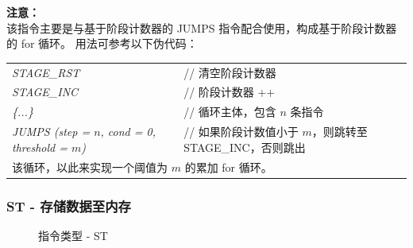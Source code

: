 \documentclass[main\_\_CN.tex]{subfiles}
\begin{document}
\vspace{-2em}
\textbf{注意：} \\
    该指令主要是与基于阶段计数器的 JUMPS 指令配合使用，构成基于阶段计数器的 for 循环。
    用法可参考以下伪代码：

\begin{table}[H]
    \centering
    \begin{tabular}{ l l }
    \textit{STAGE\_RST}  & // 清空阶段计数器   \\
    \textit{STAGE\_INC} & // 阶段计数器 ++  \\
    \textit{\{...\}} &  // 循环主体，包含 \begin{math}n\end{math} 条指令   \\
    \textit{JUMPS (step = \begin{math}n\end{math}, cond = 0, threshold = \begin{math}m\end{math})}  & // 如果阶段计数值小于 \begin{math}m\end{math}，则跳转至 STAGE\_INC，否则跳出 \\
    \multicolumn{2}{l}{该循环，以此来实现一个阈值为 \begin{math}m\end{math} 的累加 for 循环。}
    \end{tabular}
\end{table}

\subsubsection{ST - 存储数据至内存}\label{para:st-instruction}


%
%
%
%
%
%
%
%
%
%
%
%
\begin{figure}[H]
    \centering
    \caption{指令类型 - ST}
    \label{fig:ST}
\end{figure}
\end{document}
